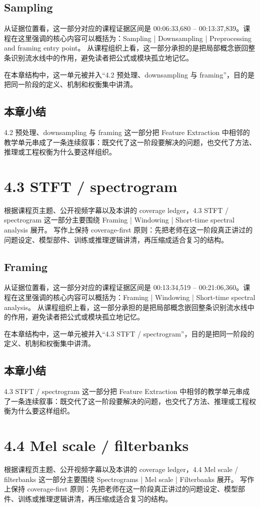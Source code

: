 \documentclass[a4paper]{article}
\begin{document}
\subsection{Sampling}
从证据位置看，这一部分对应的课程证据区间是 00:06:33,680 -- 00:13:37,839。课程在这里强调的核心内容可以概括为：Sampling | Downsampling | Preprocessing and framing entry point。
从课程组织上看，这一部分承担的是把局部概念嵌回整条识别流水线中的作用，避免读者把公式或模块孤立地记忆。

在本章结构中，这一单元被并入“4.2 预处理、downsampling 与 framing”，目的是把同一阶段的定义、机制和权衡集中讲清。

\subsection{本章小结}
4.2 预处理、downsampling 与 framing 这一部分把 Feature Extraction 中相邻的教学单元串成了一条连续叙事：既交代了这一阶段要解决的问题，也交代了方法、推理或工程权衡为什么要这样组织。

\section{4.3 STFT / spectrogram}
根据课程页主题、公开视频字幕以及本讲的 coverage ledger，4.3 STFT / spectrogram 这一部分主要围绕 Framing | Windowing | Short-time spectral analysis 展开。
写作上保持 coverage-first 原则：先把老师在这一阶段真正讲过的问题设定、模型部件、训练或推理逻辑讲清，再压缩成适合复习的结构。

\subsection{Framing}
从证据位置看，这一部分对应的课程证据区间是 00:13:34,519 -- 00:21:06,360。课程在这里强调的核心内容可以概括为：Framing | Windowing | Short-time spectral analysis。
从课程组织上看，这一部分承担的是把局部概念嵌回整条识别流水线中的作用，避免读者把公式或模块孤立地记忆。

在本章结构中，这一单元被并入“4.3 STFT / spectrogram”，目的是把同一阶段的定义、机制和权衡集中讲清。

\subsection{本章小结}
4.3 STFT / spectrogram 这一部分把 Feature Extraction 中相邻的教学单元串成了一条连续叙事：既交代了这一阶段要解决的问题，也交代了方法、推理或工程权衡为什么要这样组织。

\section{4.4 Mel scale / filterbanks}
根据课程页主题、公开视频字幕以及本讲的 coverage ledger，4.4 Mel scale / filterbanks 这一部分主要围绕 Spectrograms | Mel scale | Filterbanks 展开。
写作上保持 coverage-first 原则：先把老师在这一阶段真正讲过的问题设定、模型部件、训练或推理逻辑讲清，再压缩成适合复习的结构。
\end{document}
